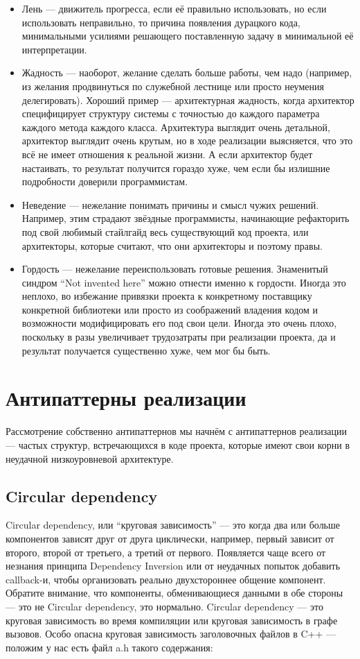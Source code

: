\documentclass{../text-style}
\begin{document}
\begin{itemize}
    \item Лень --- движитель прогресса, если её правильно использовать, но если использовать неправильно, то причина появления дурацкого кода, минимальными усилиями решающего поставленную задачу в минимальной её интерпретации.
    \item Жадность --- наоборот, желание сделать больше работы, чем надо (например, из желания продвинуться по служебной лестнице или просто неумения делегировать). Хороший пример --- архитектурная жадность, когда архитектор специфицирует структуру системы с точностью до каждого параметра каждого метода каждого класса. Архитектура выглядит очень детальной, архитектор выглядит очень крутым, но в ходе реализации выясняется, что это всё не имеет отношения к реальной жизни. А если архитектор будет настаивать, то результат получится гораздо хуже, чем если бы излишние подробности доверили программистам.
    \item Неведение --- нежелание понимать причины и смысл чужих решений. Например, этим страдают звёздные программисты, начинающие рефакторить под свой любимый стайлгайд весь существующий код проекта, или архитекторы, которые считают, что они архитекторы и поэтому правы.
    \item Гордость --- нежелание переиспользовать готовые решения. Знаменитый синдром ``Not invented here'' можно отнести именно к гордости. Иногда это неплохо, во избежание привязки проекта к конкретному поставщику конкретной библиотеки или просто из соображений владения кодом и возможности модифицировать его под свои цели. Иногда это очень плохо, поскольку в разы увеличивает трудозатраты при реализации проекта, да и результат получается существенно хуже, чем мог бы быть.
\end{itemize}

\section{Антипаттерны реализации}

Рассмотрение собственно антипаттернов мы начнём с антипаттернов реализации --- частых структур, встречающихся в коде проекта, которые имеют свои корни в неудачной низкоуровневой архитектуре.

\subsection{Circular dependency}

Circular dependency, или ``круговая зависимость'' --- это когда два или больше компонентов зависят друг от друга циклически, например, первый зависит от второго, второй от третьего, а третий от первого. Появляется чаще всего от незнания принципа Dependency Inversion или от неудачных попыток добавить callback-и, чтобы организовать реально двухстороннее общение компонент. Обратите внимание, что компоненты, обменивающиеся данными в обе стороны --- это не Circular dependency, это нормально. Circular dependency --- это круговая зависимость во время компиляции или круговая зависимость в графе вызовов. Особо опасна круговая зависимость заголовочных файлов в C++ --- положим у нас есть файл a.h такого содержания:
\end{document}
